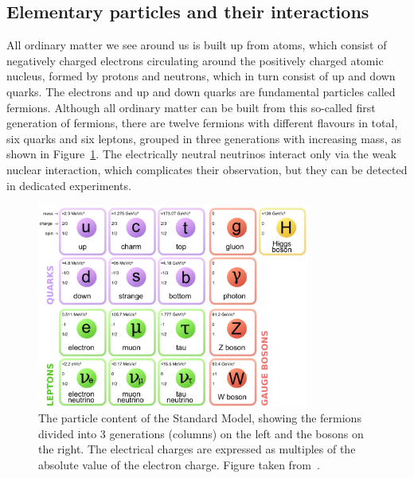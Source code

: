 \subsection{Elementary particles and their interactions}

All ordinary matter we see around us is built up from atoms, which consist of negatively charged electrons circulating around the positively charged atomic nucleus, formed by protons and neutrons, which in turn consist of up and down quarks. The electrons and up and down quarks are fundamental particles called fermions. Although all ordinary matter can be built from this so-called first generation of fermions, there are twelve fermions with different flavours in total, six quarks and six leptons, grouped in three generations with increasing mass, as shown in Figure~\ref{fig:SM}. The electrically neutral neutrinos interact only via the weak nuclear interaction, which complicates their observation, but they can be detected in dedicated experiments.

\begin{figure}[ht]
  \centering
  \includegraphics[width=0.8\textwidth]{SM.jpg}\hfill%
  \caption{The particle content of the Standard Model, showing the fermions divided into 3 generations (columns) on the left and the bosons on the right. The electrical charges are expressed as multiples of the absolute value of the electron charge. Figure taken from~\cite{quantumdiaries}.}
  \label{fig:SM}
\end{figure}

